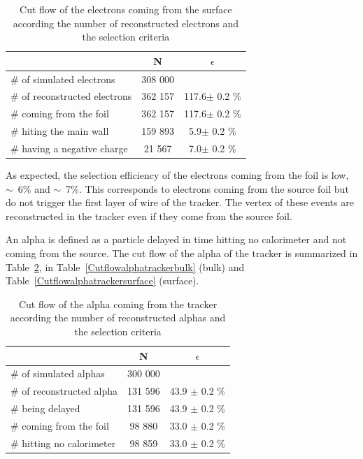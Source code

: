 \documentclass[main.tex]{subfiles}
\begin{document}
\begin{table}[h!]
\begin{center}
\begin{tabular}{l|c|c}
 & N & $\epsilon$ \\
\toprule
$\#$ of simulated electrons & 308 000 & \\
\hline
$\#$ of reconstructed electrons & 362 157 & 117.6$ \pm$ 0.2 \% \\
$\#$ coming from the foil       & 362 157 & 117.6$ \pm$ 0.2 \%\\
$\#$ hiting the main wall       & 159 893 & 5.9$ \pm$ 0.2 \%\\
$\#$ having a negative charge   & 21 567  & 7.0$ \pm$ 0.2 \%\\
\bottomrule
\end{tabular}
\end{center}
\caption{Cut flow of the electrons coming from the surface according the number of reconstructed electrons and the selection criteria}
\label{Cutflowelectrontrackersurface}
\end{table}


\bigskip

\noindent As expected, the selection efficiency of the electrons coming from the foil is low, $\sim$~6\% and $\sim$~7\%. This corresponds to electrons coming from the source foil but do not trigger the first layer of wire of the tracker. The vertex of these events are reconstructed in the tracker even if they come from the source foil.  


\bigskip


\noindent An alpha is defined as a particle delayed in time hitting no calorimeter and not coming from the source. The cut flow of the alpha of the tracker is summarized in Table~\ref{Cutflowalphatrackertracker}, in Table~\ref{Cutflowalphatrackerbulk} (bulk) and Table~\ref{Cutflowalphatrackersurface} (surface).


\begin{table}[h!]
\begin{center}
\begin{tabular}{l|c|c}
 & N & $\epsilon$ \\
\toprule
$\#$ of simulated alphas & 300 000 & \\
\hline
$\#$ of reconstructed alpha & 131 596 & 43.9 $ \pm$ 0.2 \%\\
$\#$ being delayed          & 131 596 & 43.9 $ \pm$ 0.2 \%\\
$\#$ coming from the foil   & 98 880  & 33.0 $ \pm$ 0.2 \%\\
$\#$ hitting no calorimeter & 98 859  & 33.0 $ \pm$ 0.2 \%\\
\bottomrule
\end{tabular}
\end{center}
\caption{Cut flow of the alpha coming from the tracker according the number of reconstructed alphas and the selection criteria}
\label{Cutflowalphatrackertracker}
\end{table}
\end{document}
